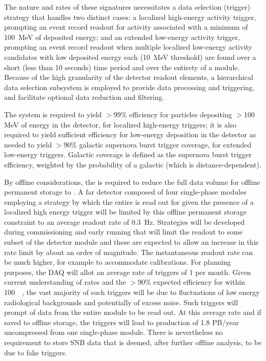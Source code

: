 The nature and rates of these signatures necessitates a data selection
(trigger) strategy that handles two
distinct cases: a localized high-energy activity trigger, prompting an event record readout for
activity associated with a minimum of \SI{100}{MeV} of deposited energy; and an extended low-energy
activity trigger, prompting an event record readout when multiple localized low-energy activity
candidates with low deposited energy each (\SI{10}{MeV} threshold) are found over a short (less than
10 seconds) time period and over the entirety of a \nominalmodsize  module. Because of the high
granularity of the detector readout elements, a hierarchical data selection subsystem is employed to
provide data processing and triggering, and facilitate optional data reduction and filtering. 

The    system is required to yield $>$99\% efficiency for particles depositing $>$100 MeV
of energy in the detector, for localized high-energy triggers; it is also required to yield
sufficient efficiency for low-energy deposition in the detector as needed to yield $>$90\% galactic
supernova burst trigger coverage, for extended low-energy triggers. Galactic coverage is defined as
the supernova burst trigger efficiency, weighted by the probability of a galactic  (which
is  distance-dependent).

By offline considerations, the  is required to reduce the
full  data volume for offline permanent storage to  \offsitepbpy.
A far detector composed of four single-phase modules employing a
strategy by which the entire  is read out for \spreadout
given the presence of a localized high energy trigger will be limited
by this offline permanent storage constraint to an average readout rate of \SI{0.3}{\hertz}. 
Strategies will be developed during commissioning and early running that will limit the readout to some subset of the detector module and these are expected to allow an increase in this rate limit by about an order of magnitude.
The instantaneous readout rate can be much higher, for example to accommodate calibrations.
For planning purposes, the DAQ will allot an average rate of  triggers of 1 per month.
Given current understanding of  rates and the $>$90\% expected efficiency for  within \SI{100}{\kilo\parsec}, the vast majority of such triggers will be due to fluctuations of low energy radiological backgrounds and potentially of excess noise.
Such triggers will prompt \snbtime of data from the entire module to be read out.
At this average rate and if saved to offline storage, the 
triggers will lead to production of 1.8 PB/year uncompressed from one
single-phase module. There is nevertheless no requirement to store SNB
data that is deemed, after further offline analysis, to be due to fake triggers.

